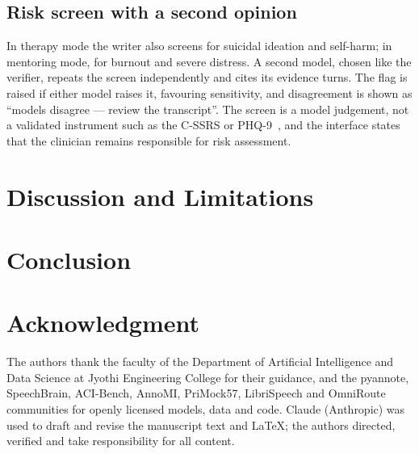 \documentclass[conference]{IEEEtran}
\begin{document}
\subsection{Risk screen with a second opinion}
In therapy mode the writer also screens for suicidal ideation and self-harm; in mentoring mode, for burnout and severe distress. A second model, chosen like the verifier, repeats the screen independently and cites its evidence turns. The flag is raised if either model raises it, favouring sensitivity, and disagreement is shown as ``models disagree --- review the transcript''. The screen is a model judgement, not a validated instrument such as the C-SSRS or PHQ-9~\cite{posner2011cssrs,kroenke2001phq9}, and the interface states that the clinician remains responsible for risk assessment.



\section{Discussion and Limitations}


\section{Conclusion}


\section*{Acknowledgment}
The authors thank the faculty of the Department of Artificial Intelligence and Data Science at Jyothi Engineering College for their guidance, and the pyannote, SpeechBrain, ACI-Bench, AnnoMI, PriMock57, LibriSpeech and OmniRoute communities for openly licensed models, data and code. Claude (Anthropic) was used to draft and revise the manuscript text and LaTeX; the authors directed, verified and take responsibility for all content.



\end{document}
